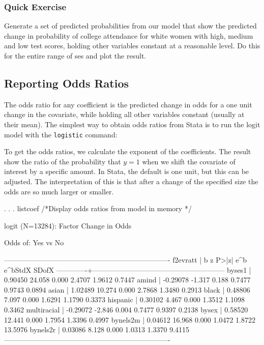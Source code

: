 \documentclass[12pt]{article}
\begin{document}
\subsubsection{Quick Exercise}

Generate a set of predicted probabilities from our model that show the
predicted change in probability of college attendance for white women
with high, medium and low test scores, holding
other variables constant at a reasonable level. Do this
for the entire range of ses and plot the result. 

\subsection{Reporting Odds Ratios}

The odds ratio for any coefficient is the predicted change in odds for
a one unit change in the covariate, while holding all other variables
constant (usually at their mean). The simplest way to obtain odds
ratios from Stata is to run the logit model with the \texttt{logistic}
command:


To get the odds ratios, we calculate the exponent of the
coefficients. The result show the ratio of the probability that $y=1$
when we shift the covariate of interest by a specific amount. In
Stata, the default is one unit, but this can be adjusted. The
interpretation of this is that after a change of the specified size
the odds are so much larger or smaller. 

\begin{stlog}
  . 
. 
. listcoef /*Display odds ratios from model in memory */

logit (N=13284): Factor Change in Odds 

  Odds of: Yes vs No

----------------------------------------------------------------------
    f2evratt |      b         z     P>|z|    e^b    e^bStdX      SDofX
-------------+--------------------------------------------------------
      byses1 |   0.90450   24.058   0.000   2.4707   1.9612     0.7447
       amind |  -0.29078   -1.317   0.188   0.7477   0.9743     0.0894
       asian |   1.02489   10.274   0.000   2.7868   1.3480     0.2913
       black |   0.48806    7.097   0.000   1.6291   1.1790     0.3373
    hispanic |   0.30102    4.467   0.000   1.3512   1.1098     0.3462
 multiracial |  -0.29072   -2.846   0.004   0.7477   0.9397     0.2138
       bysex |   0.58520   12.441   0.000   1.7954   1.3396     0.4997
    bynels2m |   0.04612   16.968   0.000   1.0472   1.8722    13.5976
    bynels2r |   0.03086    8.128   0.000   1.0313   1.3370     9.4115
----------------------------------------------------------------------

\end{stlog}
\end{document}
